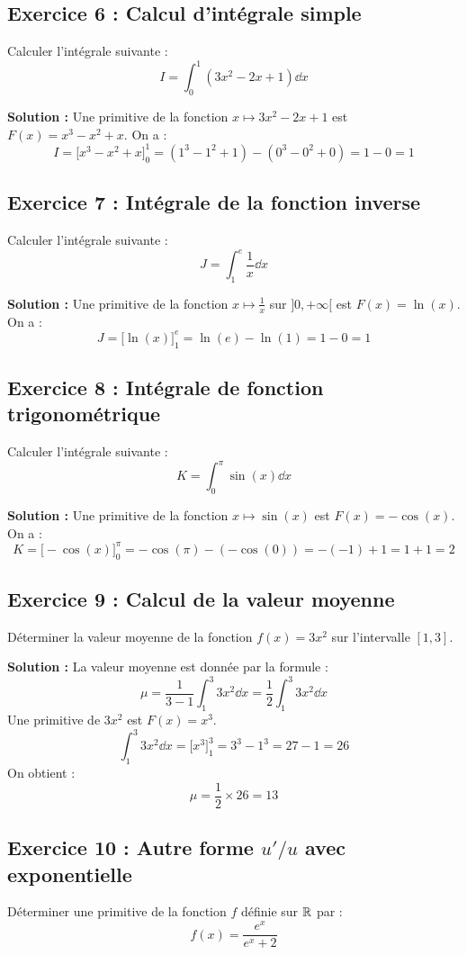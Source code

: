 \subsection*{Exercice 6 : Calcul d'intégrale simple}
Calculer l'intégrale suivante :
\[
I = \int_0^1 (3x^2 - 2x + 1) \dd x
\]

\textbf{Solution :}
Une primitive de la fonction $x \mapsto 3x^2 - 2x + 1$ est $F(x) = x^3 - x^2 + x$.
On a :
\[
I = \Big[ x^3 - x^2 + x \Big]_0^1 = (1^3 - 1^2 + 1) - (0^3 - 0^2 + 0) = 1 - 0 = 1
\]

\subsection*{Exercice 7 : Intégrale de la fonction inverse}
Calculer l'intégrale suivante :
\[
J = \int_1^e \frac{1}{x} \dd x
\]

\textbf{Solution :}
Une primitive de la fonction $x \mapsto \frac{1}{x}$ sur $]0, +\infty[$ est $F(x) = \ln(x)$.
On a :
\[
J = \Big[ \ln(x) \Big]_1^e = \ln(e) - \ln(1) = 1 - 0 = 1
\]

\subsection*{Exercice 8 : Intégrale de fonction trigonométrique}
Calculer l'intégrale suivante :
\[
K = \int_0^{\pi} \sin(x) \dd x
\]

\textbf{Solution :}
Une primitive de la fonction $x \mapsto \sin(x)$ est $F(x) = -\cos(x)$.
On a :
\[
K = \Big[ -\cos(x) \Big]_0^{\pi} = -\cos(\pi) - (-\cos(0)) = -(-1) + 1 = 1 + 1 = 2
\]

\subsection*{Exercice 9 : Calcul de la valeur moyenne}
Déterminer la valeur moyenne de la fonction $f(x) = 3x^2$ sur l'intervalle $[1, 3]$.

\textbf{Solution :}
La valeur moyenne est donnée par la formule :
\[
\mu = \frac{1}{3-1} \int_1^3 3x^2 \dd x = \frac{1}{2} \int_1^3 3x^2 \dd x
\]
Une primitive de $3x^2$ est $F(x) = x^3$.
\[
\int_1^3 3x^2 \dd x = \Big[ x^3 \Big]_1^3 = 3^3 - 1^3 = 27 - 1 = 26
\]
On obtient :
\[
\mu = \frac{1}{2} \times 26 = 13
\]

\subsection*{Exercice 10 : Autre forme $u'/u$ avec exponentielle}
Déterminer une primitive de la fonction $f$ définie sur $\mathbb{R}$ par :
\[
f(x) = \frac{e^x}{e^x + 2}
\]

